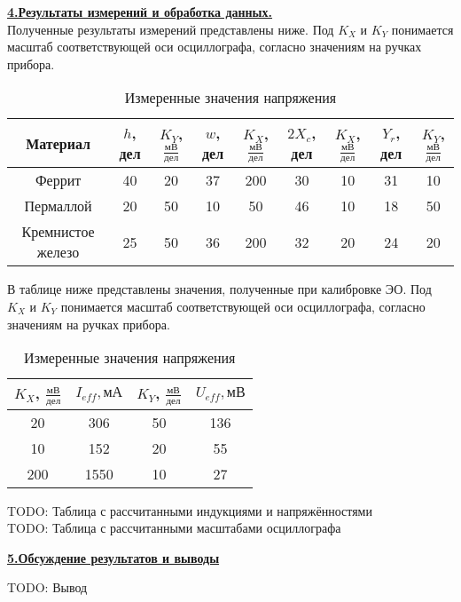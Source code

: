\documentclass[12pt, letterpaper, oneside]{article}
\begin{document}
\noindent\textbf{\underline{4.Результаты измерений и обработка данных.}}\\
Полученные результаты измерений представлены ниже. Под $K_X$ и $K_Y$ понимается масштаб соответствующей оси осциллографа, согласно значениям на ручках прибора.
\begin{table}[H]
\centering
\caption{Измеренные значения напряжения}
\begin{tabular}{|c|c|c||c|c||c|c||c|c|}
\hline
Материал & $h$, дел & $K_Y$, $\frac{мВ}{дел}$ & $w$, дел & $K_X$, $\frac{мВ}{дел}$ & $2X_c$, дел & $K_X$, $\frac{мВ}{дел}$ & $Y_r$, дел & $K_Y$, $\frac{мВ}{дел}$\\
\hline
Феррит & 40 & 20 & 37 & 200 & 30 & 10 & 31 & 10\\
\hline
Пермаллой & 20 & 50 & 10 & 50 & 46 & 10 & 18 & 50\\
\hline
Кремнистое железо & 25 & 50 & 36 & 200 & 32 & 20 & 24 & 20\\
\hline
\end{tabular}
\end{table}
В таблице ниже представлены значения, полученные при калибровке ЭО. Под $K_X$ и $K_Y$ понимается масштаб соответствующей оси осциллографа, согласно значениям на ручках прибора.
\begin{table}[H]
\centering
\caption{Измеренные значения напряжения}
\begin{tabular}{|c|c||c|c|}
\hline
$K_X$, $\frac{мВ}{дел}$ & $I_{eff}, мА$ & $K_Y$, $\frac{мВ}{дел}$ & $U_{eff}, мВ$\\
\hline
20 & 306 & 50 & 136\\
\hline
10 & 152 & 20 & 55\\
\hline
200 & 1550 & 10 & 27\\
\hline
\end{tabular}
\end{table}
\begin{Huge}\noindent
TODO: Таблица с рассчитанными индукциями и напряжённостями\\
TODO: Таблица с рассчитанными масштабами осциллографа\\
\end{Huge}
\textbf{\underline{5.Обсуждение результатов и выводы}}
\begin{Huge}
TODO: Вывод
\end{Huge}
\end{document}
